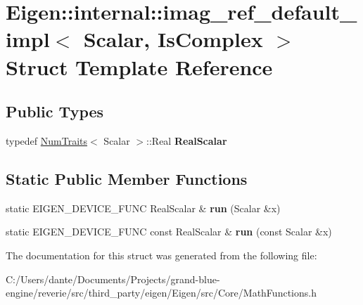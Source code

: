 \hypertarget{struct_eigen_1_1internal_1_1imag__ref__default__impl}{}\section{Eigen\+::internal\+::imag\+\_\+ref\+\_\+default\+\_\+impl$<$ Scalar, Is\+Complex $>$ Struct Template Reference}
\label{struct_eigen_1_1internal_1_1imag__ref__default__impl}
\subsection*{Public Types}
\begin{DoxyCompactItemize}
\item 
\mbox{\label{struct_eigen_1_1internal_1_1imag__ref__default__impl_aff077ee85a6a74e9d5a5866bba0cb4b2}} 
typedef \mbox{\hyperlink{struct_eigen_1_1_num_traits}{Num\+Traits}}$<$ Scalar $>$\+::Real {\bfseries Real\+Scalar}
\end{DoxyCompactItemize}
\subsection*{Static Public Member Functions}
\begin{DoxyCompactItemize}
\item 
\mbox{\label{struct_eigen_1_1internal_1_1imag__ref__default__impl_af68d1b1efe6046f7ff9a6465cacd1451}} 
static E\+I\+G\+E\+N\+\_\+\+D\+E\+V\+I\+C\+E\+\_\+\+F\+U\+NC Real\+Scalar \& {\bfseries run} (Scalar \&x)
\item 
\mbox{\label{struct_eigen_1_1internal_1_1imag__ref__default__impl_a6cbd5d0b46558d0c108840f44a00569e}} 
static E\+I\+G\+E\+N\+\_\+\+D\+E\+V\+I\+C\+E\+\_\+\+F\+U\+NC const Real\+Scalar \& {\bfseries run} (const Scalar \&x)
\end{DoxyCompactItemize}


The documentation for this struct was generated from the following file\+:\begin{DoxyCompactItemize}
\item 
C\+:/\+Users/dante/\+Documents/\+Projects/grand-\/blue-\/engine/reverie/src/third\+\_\+party/eigen/\+Eigen/src/\+Core/Math\+Functions.\+h\end{DoxyCompactItemize}
